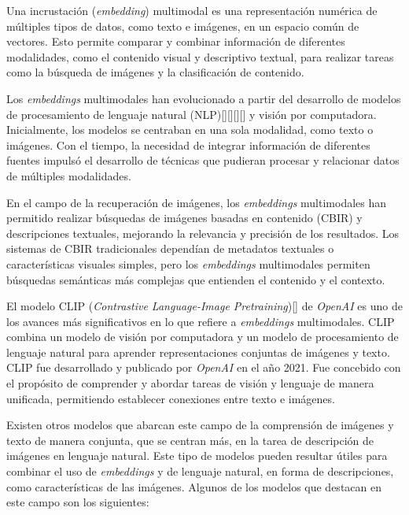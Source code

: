 Una incrustaci\'on (\textit{embedding}) multimodal es una representación numérica de múltiples tipos de datos, como texto e imágenes, en un espacio común de vectores. Esto permite comparar y combinar información de diferentes modalidades, como el contenido visual y descriptivo textual, para realizar tareas como la búsqueda de imágenes y la clasificación de contenido.

Los \textit{embeddings} multimodales han evolucionado a partir del desarrollo de modelos de procesamiento de lenguaje natural (NLP)[\cite{LLaMA2023}][\cite{gpt3}][\cite{bert}][\cite{gpt4}] y visión por computadora. Inicialmente, los modelos se centraban en una sola modalidad, como texto o imágenes. Con el tiempo, la necesidad de integrar información de diferentes fuentes impulsó el desarrollo de técnicas que pudieran procesar y relacionar datos de múltiples modalidades.


En el campo de la recuperación de imágenes, los \textit{embeddings} multimodales han permitido realizar búsquedas de imágenes basadas en contenido (CBIR) y descripciones textuales, mejorando la relevancia y precisión de los resultados. Los sistemas de CBIR tradicionales dependían de metadatos textuales o características visuales simples, pero los \textit{embeddings} multimodales permiten búsquedas semánticas más complejas que entienden el contenido y el contexto.

El modelo CLIP (\textit{Contrastive Language-Image Pretraining})[\cite{clip-paper}] de \textit{OpenAI} es uno de los avances más significativos en lo que refiere a  \textit{embeddings} multimodales. CLIP combina un modelo de visión por computadora y un modelo de procesamiento de lenguaje natural para aprender representaciones conjuntas de imágenes y texto. CLIP fue desarrollado y publicado por \textit{OpenAI} en el a\~no 2021. Fue concebido con el prop\'osito de comprender y abordar tareas de visi\'on y lenguaje de manera unificada, permitiendo establecer conexiones entre texto e im\'agenes.

Existen otros modelos que abarcan este campo de la comprensión de imágenes y texto de manera conjunta, que se centran más, en la tarea de descripción de imágenes en lenguaje natural. Este tipo de modelos pueden resultar útiles para combinar el uso de \textit{embeddings} y de lenguaje natural, en forma de descripciones, como características de las imágenes. Algunos de los modelos que destacan en este campo son los siguientes:

